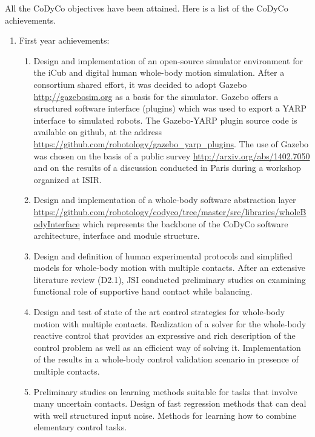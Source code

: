 \documentclass[12pt,a4paper,twoside]{article}
\begin{document}
All the CoDyCo objectives have been attained. Here is a list of the CoDyCo achievements. 
\begin{enumerate}
 
\item First year achievements:
\begin{enumerate}
\item Design and implementation of an open-source simulator environment for the iCub and digital human whole-body motion simulation. After a consortium shared effort, it was decided to adopt Gazebo \url{http://gazebosim.org} as a basis for the simulator. Gazebo offers a structured software interface (plugins) which was used to export a YARP interface to simulated robots. The Gazebo-YARP plugin source code is available on github, at the address \url{https://github.com/robotology/gazebo_yarp_plugins}. The use of Gazebo was chosen on the basis of a public survey \url{http://arxiv.org/abs/1402.7050} and on the results of a discussion conducted in Paris during a workshop organized at ISIR.

\item Design and implementation of a whole-body software abstraction layer \url{https://github.com/robotology/codyco/tree/master/src/libraries/wholeBodyInterface} which represents the backbone of the CoDyCo software architecture, interface and module structure.

\item Design and definition of human experimental protocols and simplified models for whole-body motion with multiple contacts. After an extensive literature review (D2.1), JSI conducted preliminary studies on examining functional role of supportive hand contact while balancing.

\item Design and test of state of the art control strategies for whole-body motion with multiple contacts. Realization of a solver for the whole-body reactive control that provides an expressive and rich description of the control problem as well as an efficient way of solving it. Implementation of the results in a whole-body control validation scenario in presence of multiple contacts. 

\item Preliminary studies on learning methods suitable for tasks that involve many uncertain contacts. Design of fast regression methods that can deal with well structured input noise. Methods for learning how to combine elementary control tasks.
\end{enumerate}


\end{enumerate}
\end{document}

